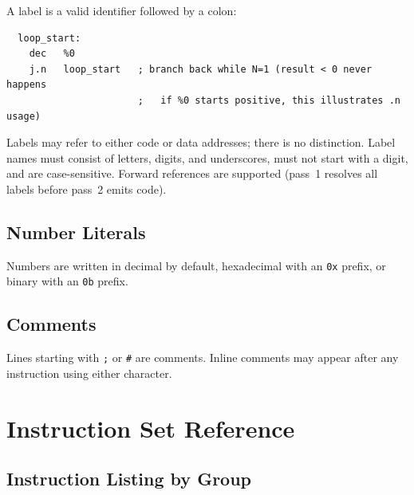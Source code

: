\documentclass[a4paper,12pt]{report}
\begin{document}
A label is a valid identifier followed by a colon:

\begin{lstlisting}
  loop_start:
    dec   %0
    j.n   loop_start   ; branch back while N=1 (result < 0 never happens
                       ;   if %0 starts positive, this illustrates .n usage)
\end{lstlisting}

Labels may refer to either code or data addresses; there is no distinction. Label names must consist of letters, digits, and underscores, must not start with a digit, and are case-sensitive. Forward references are supported (pass~1 resolves all labels before pass~2 emits code).

\section{Number Literals}

Numbers are written in decimal by default, hexadecimal with an \texttt{0x} prefix, or binary with an \texttt{0b} prefix.

\section{Comments}

Lines starting with \texttt{;} or \texttt{\#} are comments. Inline comments may appear after any instruction using either character.

\appendix

\chapter{Instruction Set Reference}
\label{app:instructionset}

\section{Instruction Listing by Group}
\end{document}
